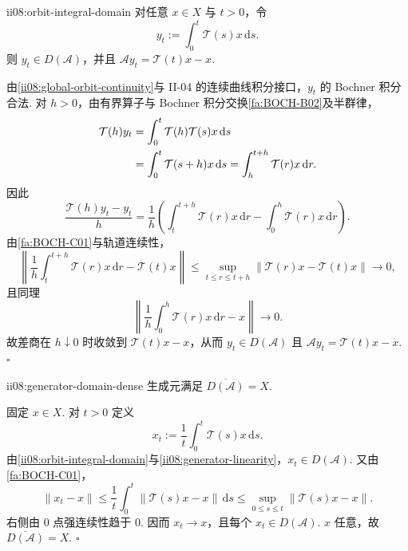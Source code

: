 \begin{FAProposition}[B][轨道积分正则化进入生成元定义域]{ii08:orbit-integral-domain}
对任意 \(\displaystyle x\in X\) 与 \(\displaystyle t>0\)，令
\[
y_t
:=
\int_0^t\mathcal T(s)x\,\mathrm{d}s.
\]
则 \(\displaystyle y_t\in D(\mathcal A)\)，并且
\(\displaystyle \mathcal Ay_t = \mathcal T(t)x-x.\)
\end{FAProposition}

\begin{FAProof}
由\autoref{ii08:global-orbit-continuity}与 II-04 的连续曲线积分接口，\(\displaystyle y_t\) 的 Bochner 积分合法. 对 \(\displaystyle h>0\)，由有界算子与 Bochner 积分交换\autoref{fa:BOCH-B02}及半群律，
\[
\begin{aligned}
\displaystyle \mathcal T(h)y_t &\displaystyle = \int_0^t\mathcal T(h)\mathcal T(s)x\,\mathrm{d}s\\
\displaystyle &\displaystyle = \int_0^t\mathcal T(s+h)x\,\mathrm{d}s = \int_h^{t+h}\mathcal T(r)x\,\mathrm{d}r.
\end{aligned}
\]
因此
\[
\frac{\mathcal T(h)y_t-y_t}{h}
=
\frac{1}{h}
\left(
\int_t^{t+h}\mathcal T(r)x\,\mathrm{d}r
-
\int_0^h\mathcal T(r)x\,\mathrm{d}r
\right).
\]
由\autoref{fa:BOCH-C01}与轨道连续性，
\[
\left\|
\frac{1}{h}\int_t^{t+h}\mathcal T(r)x\,\mathrm{d}r-\mathcal T(t)x
\right\|
\leqslant
\sup_{t\leqslant r\leqslant t+h}\|\mathcal T(r)x-\mathcal T(t)x\|
\longrightarrow0,
\]
且同理
\[
\left\|
\frac{1}{h}\int_0^h\mathcal T(r)x\,\mathrm{d}r-x
\right\|
\longrightarrow0.
\]
故差商在 \(\displaystyle h\downarrow0\) 时收敛到 \(\displaystyle\mathcal T(t)x-x\)，从而 \(\displaystyle y_t\in D(\mathcal A)\) 且 \(\displaystyle\mathcal Ay_t=\mathcal T(t)x-x\).
\hfill\(\square\)
\end{FAProof}

\begin{FAProposition}[A][生成元定义域稠密]{ii08:generator-domain-dense}
生成元满足
\(\displaystyle \overline{D(\mathcal A)}=X.\)
\end{FAProposition}

\begin{FAProof}
固定 \(\displaystyle x\in X\). 对 \(\displaystyle t>0\) 定义
\[
x_t
:=
\frac1t\int_0^t\mathcal T(s)x\,\mathrm{d}s.
\]
由\autoref{ii08:orbit-integral-domain}与\autoref{ii08:generator-linearity}，\(\displaystyle x_t\in D(\mathcal A)\). 又由\autoref{fa:BOCH-C01}，
\[
\|x_t-x\|
\leqslant
\frac1t\int_0^t\|\mathcal T(s)x-x\|\,\mathrm{d}s
\leqslant
\sup_{0\leqslant s\leqslant t}\|\mathcal T(s)x-x\|.
\]
右侧由 \(\displaystyle0\) 点强连续性趋于 \(\displaystyle0\). 因而 \(\displaystyle x_t\to x\)，且每个 \(\displaystyle x_t\in D(\mathcal A)\). \(\displaystyle x\) 任意，故 \(\displaystyle\overline{D(\mathcal A)}=X\).
\hfill\(\square\)
\end{FAProof}


